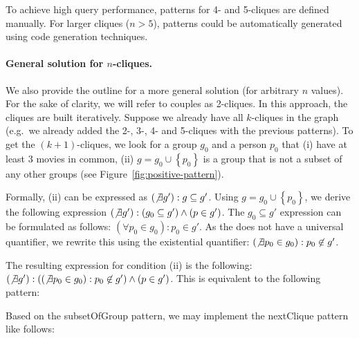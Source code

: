To achieve high query performance, patterns for 4- and 5-cliques are defined manually. For larger cliques ($n > 5$), patterns could be automatically generated using code generation techniques.


\paragraph{General solution for $n$-cliques.} We also provide the outline for a more general solution (for arbitrary $n$ values). For the sake of clarity, we will refer to couples as 2-cliques. In this approach, the cliques are built iteratively. Suppose we already have all $k$-cliques in the graph (e.g.\ we already added the 2-, 3-, 4- and 5-cliques with the previous patterns). To get the $(k+1)$-cliques, we look for a group $g_0$ and a person $p_0$ that (i) have at least 3 movies in common, (ii) $ g = g_0 \cup \left\{p_0\right\} $ is a group that is not a subset of any other groups (see Figure~\ref{fig:positive-pattern}).


Formally, (ii) can be expressed as $ \left(\not\exists g'\right): g \subseteq g' $. Using $ g = g_0 \cup \left\{p_0\right\} $, we derive the following expression $\left(\not\exists g'\right): \left(g_0 \subseteq g'\right) \wedge \left(p \in g'\right)$. The $g_0 \subseteq g'$ expression can be formulated as follows: $\left(\forall p_0 \in g_0\right): p_0 \in g'$. As the \iqpl{} does not have a universal quantifier, we rewrite this using the existential quantifier: $\left(\not\exists p_0 \in g_0\right): p_0 \not\in g'$.


The resulting expression for condition (ii) is the following: $\left(\not\exists g'\right): \left(\left(\not\exists p_0 \in g_0\right): p_0 \not\in g'\right) \wedge \left(p \in g'\right)$. This is equivalent to the following \incquery{} pattern:

\begin{figure}[!t]
    \begin{minipage}{.50\textwidth}
	\end{minipage}
    \hspace{0.03\textwidth}
    \begin{minipage}{.48\textwidth}
	\end{minipage}
\end{figure}

Based on the \textsf{subsetOfGroup} pattern, we may implement the \textsf{nextClique} pattern like follows:


